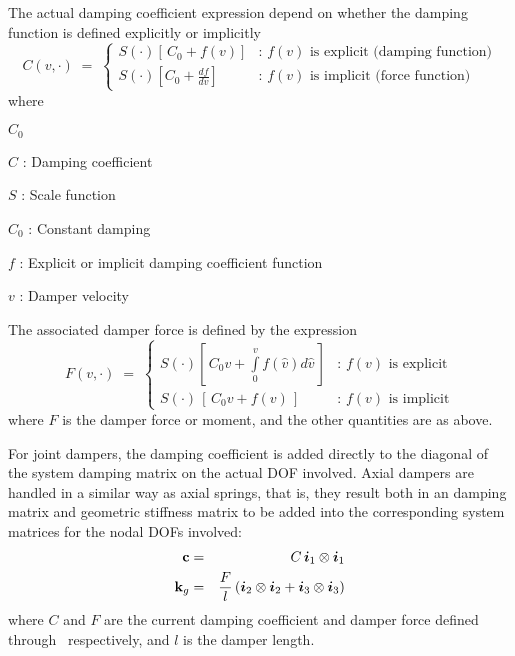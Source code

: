 The actual damping coefficient expression depend on whether the damping
function is defined explicitly or implicitly
%
\begin{equation}
C(v,\cdot) \;=\; \left\{\begin{array}{ll}
S(\cdot)\left[\, C_0 + f(v) \right] &
\text{: $f(v)$ is explicit (damping function)} \\[1mm]
S(\cdot)\left[ C_0 + \frac{df}{dv} \right] &
\text{: $f(v)$ is implicit (force function)}
\end{array}\right.
\label{eq:damping}
\end{equation}
%
where
%
\begin{namelist}{$C_0$}
\item[$C$]   : Damping coefficient
\item[$S$]   : Scale function
\item[$C_0$] : Constant damping
\item[$f$]   : Explicit or implicit damping coefficient function
\item[$v$]   : Damper velocity
\end{namelist}
%
The associated damper force is defined by the expression
%
\begin{equation}
F(v,\cdot) \;=\; \left\{\begin{array}{ll}
S(\cdot) \left[\, C_0 v + \int\limits_0^v f(\hat v) d\hat v \,\right] &
\text{: $f(v)$ is explicit} \\[5mm]
S(\cdot) \,\left[\, C_0 v + f(v) \,\right] &
\text{: $f(v)$ is implicit}
\end{array}\right.
\label{eq:damper force}
\end{equation}
%
where $F$ is the damper force or moment, and the other quantities are as above.


For joint dampers, the damping coefficient is added directly to the diagonal of
the system damping matrix on the actual DOF involved.
Axial dampers are handled in a similar way as axial springs, that is,
they result both in an damping matrix and geometric stiffness matrix to be
added into the corresponding system matrices for the nodal DOFs involved:
%
\begin{eqnarray}
{\bf c} &=& C\,\mbox{\boldmath $i$}_1\otimes\mbox{\boldmath $i$}_1 \\
{\bf k}_g &=& \frac{F}{l} \left(\mbox{\boldmath $i$}_2\otimes\mbox{\boldmath $i$}_2 + \mbox{\boldmath $i$}_3\otimes\mbox{\boldmath $i$}_3\right)
\end{eqnarray}
%
where $C$ and $F$ are the current damping coefficient and damper force defined
through~ respectively,
and $l$ is the damper length.

